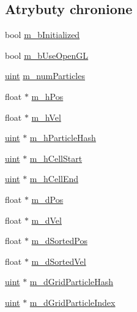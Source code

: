 \subsection*{Atrybuty chronione}
\begin{DoxyCompactItemize}
\item 
bool \hyperlink{class_particle_system_a21bbfba9d8701a70bc6fddbf4fc3f5bd}{m\-\_\-b\-Initialized}
\item 
bool \hyperlink{class_particle_system_a5d99413ffc0791e6aa9f02308caf7f1e}{m\-\_\-b\-Use\-Open\-G\-L}
\item 
\hyperlink{particles__kernel_8cuh_a91ad9478d81a7aaf2593e8d9c3d06a14}{uint} \hyperlink{class_particle_system_a23d238efa80a647d4b6cde034f486a91}{m\-\_\-num\-Particles}
\item 
float $\ast$ \hyperlink{class_particle_system_ab9d75471d2eaaeb8fa98d2f3f47d9c25}{m\-\_\-h\-Pos}
\item 
float $\ast$ \hyperlink{class_particle_system_a20560c896ee8a8bbc827a8e5902da7e2}{m\-\_\-h\-Vel}
\item 
\hyperlink{particles__kernel_8cuh_a91ad9478d81a7aaf2593e8d9c3d06a14}{uint} $\ast$ \hyperlink{class_particle_system_a4280ede7d75e44c8c0d4edfa5ee7dd02}{m\-\_\-h\-Particle\-Hash}
\item 
\hyperlink{particles__kernel_8cuh_a91ad9478d81a7aaf2593e8d9c3d06a14}{uint} $\ast$ \hyperlink{class_particle_system_a8412ecd991c14d906fcebba42bdeffd3}{m\-\_\-h\-Cell\-Start}
\item 
\hyperlink{particles__kernel_8cuh_a91ad9478d81a7aaf2593e8d9c3d06a14}{uint} $\ast$ \hyperlink{class_particle_system_a8d8ad2d142f3a5b83f2c10a46f5d7a8b}{m\-\_\-h\-Cell\-End}
\item 
float $\ast$ \hyperlink{class_particle_system_afff6217d2726217dff77c81ef3c23bfa}{m\-\_\-d\-Pos}
\item 
float $\ast$ \hyperlink{class_particle_system_a5efd31a2fdba8d98b105f4e546964cb5}{m\-\_\-d\-Vel}
\item 
float $\ast$ \hyperlink{class_particle_system_ab60e8b5a312b2f400b10dfba5153fc3c}{m\-\_\-d\-Sorted\-Pos}
\item 
float $\ast$ \hyperlink{class_particle_system_a69122523117954fb5defb8b38e0f46f3}{m\-\_\-d\-Sorted\-Vel}
\item 
\hyperlink{particles__kernel_8cuh_a91ad9478d81a7aaf2593e8d9c3d06a14}{uint} $\ast$ \hyperlink{class_particle_system_ab44080655971a5501eaee6ad7355a139}{m\-\_\-d\-Grid\-Particle\-Hash}
\item 
\hyperlink{particles__kernel_8cuh_a91ad9478d81a7aaf2593e8d9c3d06a14}{uint} $\ast$ \hyperlink{class_particle_system_a1a67fc1e3ffd4e64f55a2a315c49c74c}{m\-\_\-d\-Grid\-Particle\-Index}

\end{DoxyCompactItemize}
